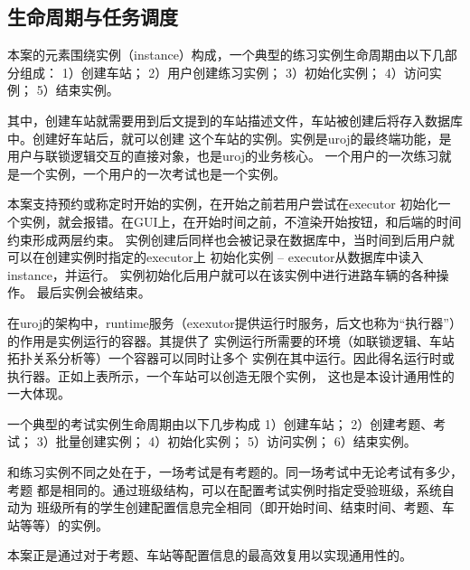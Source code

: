 \subsection{生命周期与任务调度}
本案的元素围绕实例（instance）构成，一个典型的练习实例生命周期由以下几部分组成：
1）创建车站；
2）用户创建练习实例；
3）初始化实例；
4）访问实例；
5）结束实例。

其中，创建车站就需要用到后文提到的车站描述文件，车站被创建后将存入数据库中。创建好车站后，就可以创建
这个车站的实例。实例是uroj的最终端功能，是用户与联锁逻辑交互的直接对象，也是uroj的业务核心。
一个用户的一次练习就是一个实例，一个用户的一次考试也是一个实例。

本案支持预约或称定时开始的实例，在开始之前若用户尝试在executor
初始化一个实例，就会报错。在GUI上，在开始时间之前，不渲染开始按钮，和后端的时间约束形成两层约束。
实例创建后同样也会被记录在数据库中，当时间到后用户就可以在创建实例时指定的executor上
初始化实例 -- executor从数据库中读入instance，并运行。
实例初始化后用户就可以在该实例中进行进路车辆的各种操作。
最后实例会被结束。

在uroj的架构中，runtime服务（exexutor提供运行时服务，后文也称为“执行器”）的作用是实例运行的容器。其提供了
实例运行所需要的环境（如联锁逻辑、车站拓扑关系分析等）一个容器可以同时让多个
实例在其中运行。因此得名运行时或执行器。正如上表所示，一个车站可以创造无限个实例，
这也是本设计通用性的一大体现。

一个典型的考试实例生命周期由以下几步构成
1）创建车站；
2）创建考题、考试；
3）批量创建实例；
4）初始化实例；
5）访问实例；
6）结束实例。

和练习实例不同之处在于，一场考试是有考题的。同一场考试中无论考试有多少，考题
都是相同的。通过班级结构，可以在配置考试实例时指定受验班级，系统自动为
班级所有的学生创建配置信息完全相同（即开始时间、结束时间、考题、车站等等）的实例。

本案正是通过对于考题、车站等配置信息的最高效复用以实现通用性的。